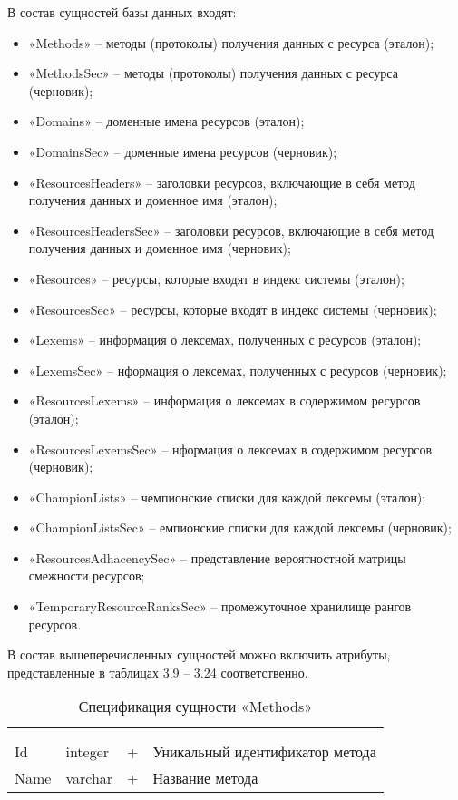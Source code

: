 В состав сущностей базы данных входят:
\begin{itemize}
\item «Methods» -- методы (протоколы) получения данных с ресурса (эталон);
\item «MethodsSec» -- методы (протоколы) получения данных с ресурса (черновик);
\item «Domains» -- доменные имена ресурсов (эталон);
\item «DomainsSec» -- доменные имена ресурсов (черновик);
\item «ResourcesHeaders» -- заголовки ресурсов, включающие в себя метод получения данных и доменное имя (эталон);
\item «ResourcesHeadersSec» -- заголовки ресурсов, включающие в себя метод получения данных и доменное имя (черновик);
\item «Resources» -- ресурсы, которые входят в индекс системы (эталон);
\item «ResourcesSec» -- ресурсы, которые входят в индекс системы (черновик);
\item «Lexems» -- информация о лексемах, полученных с ресурсов (эталон);
\item «LexemsSec» -- нформация о лексемах, полученных с ресурсов (черновик);
\item «ResourcesLexems» -- информация о лексемах в содержимом ресурсов (эталон);
\item «ResourcesLexemsSec» -- нформация о лексемах в содержимом ресурсов (черновик);
\item «ChampionLists» -- чемпионские списки для каждой лексемы (эталон);
\item «ChampionListsSec» -- емпионские списки для каждой лексемы (черновик);
\item «ResourcesAdhacencySec» -- представление вероятностной матрицы смежности ресурсов;
\item «TemporaryResourceRanksSec» -- промежуточное хранилище рангов ресурсов.
\end{itemize}

В состав вышеперечисленных сущностей можно включить атрибуты, представленные в таблицах 3.9 – 3.24 соответственно.

\begin{xltabular}{\textwidth}{|X|X|X|X|}
	\caption{Спецификация сущности «Methods»}\label{indexer_methods:table}\\ \hline
	 &  &  &  \\ \hline
	 &  &  &  \\ \hline
	\endfirsthead
	 \hline
	 &  &  &  \\ \hline
	\endhead
	Id & integer & + & Уникальный идентификатор метода \\ \hline
	Name & varchar & + & Название метода \\ \hline
\end{xltabular}

